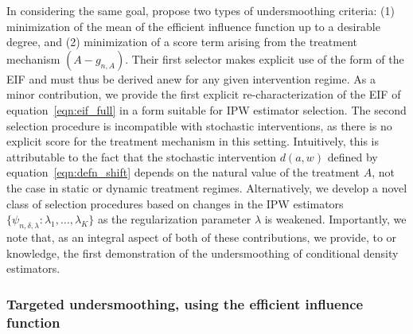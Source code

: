 In considering the same goal, \citet{ertefaie2020nonparametric} propose two
types of undersmoothing criteria: (1) minimization of the mean of the efficient
influence function up to a desirable degree, and (2) minimization of a score
term arising from the treatment mechanism $(A - g_{n,A})$. Their first selector
makes explicit use of the form of the EIF and must thus be derived anew for any
given intervention regime. As a minor contribution, we provide the first
explicit re-characterization of the EIF of equation~\ref{eqn:eif_full} in a form
suitable for IPW estimator selection. The second selection procedure is
incompatible with stochastic interventions, as there is no explicit score for
the treatment mechanism in this setting. Intuitively, this is attributable to
the fact that the stochastic intervention $d(a,w)$ defined by
equation~\ref{eqn:defn_shift} depends on the natural value of the treatment $A$,
not the case in static or dynamic treatment regimes. Alternatively, we develop
a novel class of selection procedures based on changes in the IPW estimators
$\{\psi_{n,\delta,\lambda}: \lambda_1, \ldots, \lambda_K \}$ as the
regularization parameter $\lambda$ is weakened. Importantly, we note that, as an
integral aspect of both of these contributions, we provide, to or knowledge, the
first demonstration of the undersmoothing of conditional density estimators.

\subsubsection{Targeted undersmoothing, using the efficient influence function}

